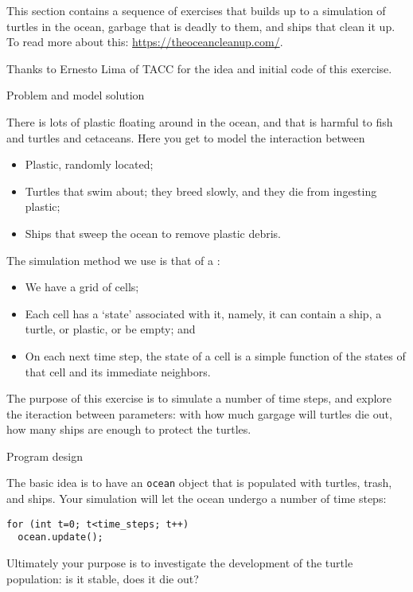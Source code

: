 
This section contains a sequence of exercises that builds up to a
 simulation
of turtles in the ocean, garbage that is deadly to them,
and ships that clean it up.
To read more about this: \url{https://theoceancleanup.com/}.

Thanks to Ernesto Lima of TACC for the idea and initial code
of this exercise.

 {Problem and model solution}

There is lots of plastic floating around in the ocean,
and that is harmful to fish and turtles and cetaceans.
Here you get to model the interaction between
\begin{itemize}
\item Plastic, randomly located;
\item Turtles that swim about; they breed slowly, and they die from
  ingesting plastic;
\item Ships that sweep the ocean to remove plastic debris.
\end{itemize}

The simulation method we use is that of a :
\begin{itemize}
\item We have a grid of cells;
\item Each cell has a `state' associated with it, namely,
  it can contain a ship, a turtle, or plastic, or be empty; and
\item On each next time step, the state of a cell is a simple
  function of the states of that cell and its immediate neighbors.
\end{itemize}

The purpose of this exercise is to simulate a number of time steps,
and explore the iteraction between parameters: with how much gargage will turtles
die out, how many ships are enough to protect the turtles.

 {Program design}

The basic idea is to have an \lstinline{ocean} object that
is populated with turtles, trash, and ships.
Your simulation will let the ocean undergo a number of time steps:
\begin{lstlisting}
for (int t=0; t<time_steps; t++)
  ocean.update();
\end{lstlisting}
Ultimately your purpose is to investigate the development of the turtle population:
is it stable, does it die out?

